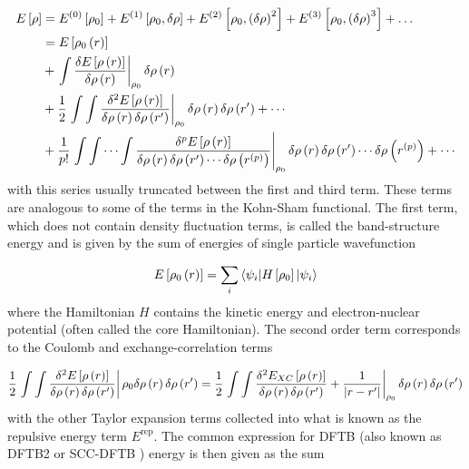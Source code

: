 \begin{equation}
    \begin{split}
    E\left[\rho\right] &= E^{\left(0\right)}\left[\rho_0\right] + E^{\left(1\right)}\left[\rho_0, \delta\rho\right] + E^{\left(2\right)}\left[\rho_0, \left(\delta\rho\right)^2\right] + E^{\left(3\right)}\left[\rho_0, \left(\delta\rho\right)^3\right] + \dots \\
    &= E_{} \left[ \rho_0\left(r\right) \right] \\
    &+ \left. \int \frac{\delta E_{} \left[ \rho\left(r\right) \right]}{\delta \rho\left(r\right)} \right\rvert_{\rho_0}  \delta \rho \left( r \right) \\
    &+ \frac{1}{2} \left. \int\int \frac{\delta^2 E_{} \left[ \rho\left(r\right) \right]}{\delta \rho\left(r\right)\delta \rho\left(r^\prime\right)} \right\rvert_{\rho_0} \delta \rho \left( r \right) \delta \rho \left( r^\prime \right) + \cdots \\
    &+ \frac{1}{p!} \left. \int\int \cdots\int \frac{\delta^p E_{} \left[ \rho\left(r\right) \right]}{\delta \rho\left(r\right)\delta \rho\left(r^\prime\right) \cdots \delta \rho\left(r^{\left(p\right)}\right)} \right\rvert_{\rho_0} \delta \rho \left( r \right) \delta \rho \left( r^\prime \right) \cdots \delta \rho\left(r^{\left(p\right)}\right) + \cdots
    \end{split}
\end{equation}
%
with this series usually truncated between the first and third term\cite{Gaus2011, Koskinen2009}. 
These terms are analogous to some of the terms in the Kohn-Sham functional. The 
first term, which does not contain density fluctuation terms, is called the band-structure
energy and is given by the sum of energies of single particle wavefunction

\begin{equation}
    E_{} \left[ \rho_0\left(r\right) \right] =  \sum_i \braket{\psi_i|H_{} \left[ \rho_0 \right]|\psi_i}
\end{equation}
%
where the Hamiltonian $H$ contains the kinetic energy and electron-nuclear potential
(often called the core Hamiltonian). The second order term corresponds to the Coulomb 
and exchange-correlation terms

\begin{equation}
    \frac{1}{2} \left. \int\int \frac{\delta^2 E_{} \left[ \rho\left(r\right) \right]}{\delta \rho\left(r\right)\delta \rho\left(r^\prime\right)} \right\rvert {\rho_0} \delta \rho \left( r \right) \delta \rho \left( r^\prime \right) = \frac{1}{2} \left. \int\int \frac{\delta^2 E_{XC} \left[ \rho\left(r\right) \right]}{\delta \rho\left(r\right)\delta \rho\left(r^\prime\right)} + \frac{1}{\left\lvert r-r^\prime \right\rvert} \right\rvert_{\rho_0} \delta \rho \left( r \right) \delta \rho \left( r^\prime \right)
\end{equation}
%
with the other Taylor expansion terms collected into what is known as the repulsive
energy term $E^\text{rep}$. The common expression for DFTB (also known as DFTB2
or SCC-DFTB \cite{Elstner1998}) energy is then given as the sum

